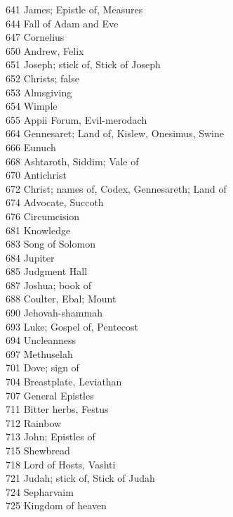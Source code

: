 641 \quad James; Epistle of, Measures\\
644 \quad Fall of Adam and Eve\\
647 \quad Cornelius\\
650 \quad Andrew, Felix\\
651 \quad Joseph; stick of, Stick of Joseph\\
652 \quad Christs; false\\
653 \quad Almsgiving\\
654 \quad Wimple\\
655 \quad Appii Forum, Evil-merodach\\
664 \quad Gennesaret; Land of, Kislew, Onesimus, Swine\\
666 \quad Eunuch\\
668 \quad Ashtaroth, Siddim; Vale of\\
670 \quad Antichrist\\
672 \quad Christ; names of, Codex, Gennesareth; Land of\\
674 \quad Advocate, Succoth\\
676 \quad Circumcision\\
681 \quad Knowledge\\
683 \quad Song of Solomon\\
684 \quad Jupiter\\
685 \quad Judgment Hall\\
687 \quad Joshua; book of\\
688 \quad Coulter, Ebal; Mount\\
690 \quad Jehovah-shammah\\
693 \quad Luke; Gospel of, Pentecost\\
694 \quad Uncleanness\\
697 \quad Methuselah\\
701 \quad Dove; sign of\\
704 \quad Breastplate, Leviathan\\
707 \quad General Epistles\\
711 \quad Bitter herbs, Festus\\
712 \quad Rainbow\\
713 \quad John; Epistles of\\
715 \quad Shewbread\\
718 \quad Lord of Hosts, Vashti\\
721 \quad Judah; stick of, Stick of Judah\\
724 \quad Sepharvaim\\
725 \quad Kingdom of heaven\\
